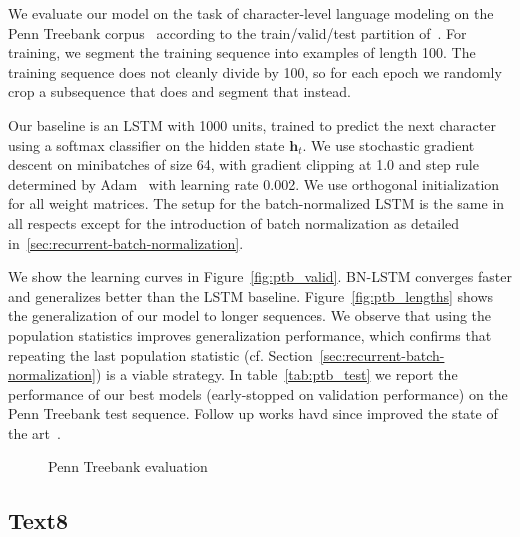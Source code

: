 \documentclass{article} \pdfoutput=1 \usepackage[utf8]{inputenc}
\newcommand{\vect}[1]{\mathbf{#1}}
\begin{document}
We evaluate our model on the task of character-level language modeling on the
Penn Treebank corpus~\citep{penntreebank} according to the train/valid/test
partition of~\citet{mikolov2012subword}.  For training, we segment the training
sequence into examples of length 100.  The training sequence does not cleanly
divide by 100, so for each epoch we randomly crop a subsequence that does and
segment that instead.

Our baseline is an LSTM with 1000 units, trained to predict the next character
using a softmax classifier on the hidden state $\vect{h}_t$.  We use stochastic
gradient descent on minibatches of size 64, with gradient clipping at 1.0 and
step rule determined by Adam~\citep{kingma2014adam} with learning rate 0.002.
We use orthogonal initialization for all weight matrices.  The setup for the
batch-normalized LSTM is the same in all respects except for the introduction
of batch normalization as detailed in~\ref{sec:recurrent-batch-normalization}.

We show the learning curves in Figure~\ref{fig:ptb_valid}.  BN-LSTM converges
faster and generalizes better than the LSTM baseline.
Figure~\ref{fig:ptb_lengths} shows the generalization of our model to longer
sequences.  We observe that using the population statistics improves
generalization performance, which confirms that repeating the last population
statistic (cf. Section~\ref{sec:recurrent-batch-normalization}) is a viable
strategy.  In table~\ref{tab:ptb_test} we report the performance of our best
models (early-stopped on validation performance) on the Penn Treebank test
sequence.  Follow up works havd since improved the state of the
art~\citep{krueger2016zoneout,chung2016hierarchical,ha2016hypernetworks}.

\begin{figure}[!hb]
  \center {}\hspace{2mm}
  \caption{Penn Treebank evaluation}
  \label{fig:ptb}
\end{figure}

\subsection{Text8}
\end{document}
